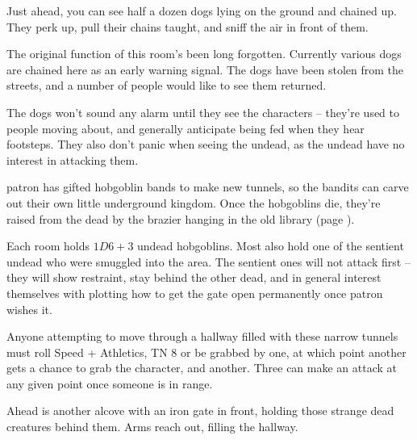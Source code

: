 \begin{multicols}{2}
\begin{boxtext}
\end{boxtext}


\begin{boxtext}

	Just ahead, you can see half a dozen dogs lying on the ground and chained up.  They perk up, pull their chains taught, and sniff the air in front of them.

\end{boxtext}

The original function of this room's been long forgotten.  Currently various dogs are chained here as an early warning signal.  The dogs have been stolen from the streets, and a number of people would like to see them returned.

The dogs won't sound any alarm until they see the characters -- they're used to people moving about, and generally anticipate being fed when they hear footsteps.  They also don't panic when seeing the undead, as the undead have no interest in attacking them.

\Gls{patron} has gifted hobgoblin bands to make new tunnels, so the bandits can carve out their own little underground kingdom.  Once the hobgoblins die, they're raised from the dead by the brazier hanging in the old library (page \pageref{oldlibrary}).

Each room holds $1D6+3$ undead hobgoblins.  Most also hold one of the sentient undead who were smuggled into the area.  The sentient ones will not attack first -- they will show restraint, stay behind the other dead, and in general interest themselves with plotting how to get the gate open permanently once \gls{patron} wishes it.



Anyone attempting to move through a hallway filled with these narrow tunnels must roll Speed + Athletics, TN 8 or be grabbed by one, at which point another gets a chance to grab the character, and another.  Three can make an attack at any given point once someone is in range.

\begin{boxtext}

	Ahead is another alcove with an iron gate in front, holding those strange dead creatures behind them.  Arms reach out, filling the hallway.

\end{boxtext}


\end{multicols}
